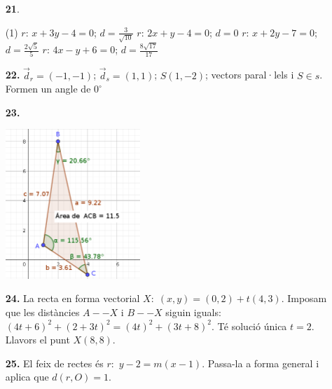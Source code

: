 \documentclass[a4paper, pdf, twoside]{book}
\begin{document}
\begin{multicols}{2}
\begin{enumerate}

 \item[\fontfamily{phv}\selectfont\color{blue}\textbf{21}. ] 
 \begin{tasks}[column-sep=1em, item-indent=1.3333em](1)
	 \task* $r:\,x+3y-4=0$; $d=\frac {3}{\sqrt {10}}$
	 \task $r:\,2x+y-4=0$; $d=0$
	 \task* $r:\,x+2y-7=0$; $d=\frac {2\sqrt {5}}{5}$
	 \task* $r:\,4x-y+6=0$; $d=\frac {8\sqrt {17}}{17}$ 
\end{tasks}
 \end{enumerate}
\begin{enumerate}
\vspace{0.25cm}
\item[\fontfamily{phv}\selectfont\color{blue}\textbf{22. }] 
$\vec d_r=(-1,-1)$; $\vec d_s=(1,1)$; $S(1,-2)$; vectors paral·lels i $S\in s$. Formen un angle de $0^\circ $ 
\vspace{0.25cm}
\item[\fontfamily{phv}\selectfont\color{blue}\textbf{23. }] 
\mbox {}\par \includegraphics [width=0.4\textwidth ]{img-sol/t9-21}
\vspace{0.25cm}
\item[\fontfamily{phv}\selectfont\color{blue}\textbf{24. }] 
La recta en forma vectorial $X:\; (x,y)=(0,2)+t(4,3)$. Imposam que les distàncies $A--X$ i $B--X$ siguin iguals: $(4t+6)^2+(2+3t)^2=(4t)^2+(3t+8)^2$. Té solució única $t=2$. Llavors el punt $X(8, 8)$.
\vspace{0.25cm}
\item[\fontfamily{phv}\selectfont\color{blue}\textbf{25. }]  \scalebox{0.6}{\simbolcompass } 
El feix de rectes és $r:$ $y-2=m(x-1)$. Passa-la a forma general i aplica que $d(r,O)=1$.
 \end{enumerate}
\vspace{0.3cm}



\end{multicols}
\end{document}
